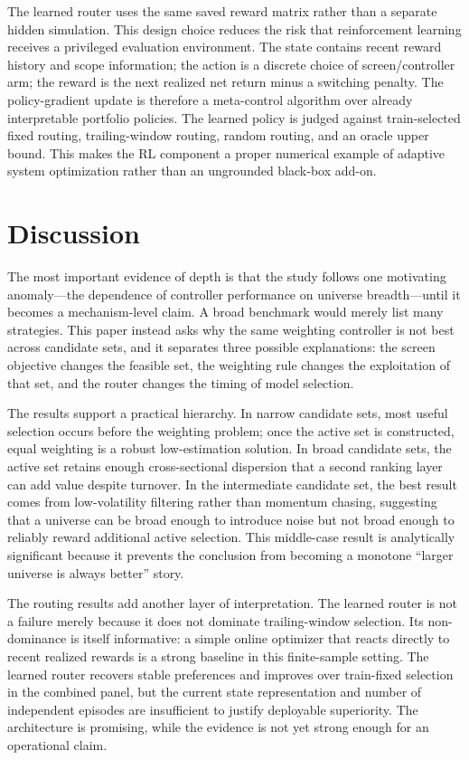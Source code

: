 \documentclass[journal,10pt]{IEEEtran}
\begin{document}
The learned router uses the same saved reward matrix rather than a separate hidden simulation. This design choice reduces the risk that reinforcement learning receives a privileged evaluation environment. The state contains recent reward history and scope information; the action is a discrete choice of screen/controller arm; the reward is the next realized net return minus a switching penalty. The policy-gradient update is therefore a meta-control algorithm over already interpretable portfolio policies. The learned policy is judged against train-selected fixed routing, trailing-window routing, random routing, and an oracle upper bound. This makes the RL component a proper numerical example of adaptive system optimization rather than an ungrounded black-box add-on.

\section{Discussion}
The most important evidence of depth is that the study follows one motivating anomaly---the dependence of controller performance on universe breadth---until it becomes a mechanism-level claim. A broad benchmark would merely list many strategies. This paper instead asks why the same weighting controller is not best across candidate sets, and it separates three possible explanations: the screen objective changes the feasible set, the weighting rule changes the exploitation of that set, and the router changes the timing of model selection.

The results support a practical hierarchy. In narrow candidate sets, most useful selection occurs before the weighting problem; once the active set is constructed, equal weighting is a robust low-estimation solution. In broad candidate sets, the active set retains enough cross-sectional dispersion that a second ranking layer can add value despite turnover. In the intermediate candidate set, the best result comes from low-volatility filtering rather than momentum chasing, suggesting that a universe can be broad enough to introduce noise but not broad enough to reliably reward additional active selection. This middle-case result is analytically significant because it prevents the conclusion from becoming a monotone ``larger universe is always better'' story.

The routing results add another layer of interpretation. The learned router is not a failure merely because it does not dominate trailing-window selection. Its non-dominance is itself informative: a simple online optimizer that reacts directly to recent realized rewards is a strong baseline in this finite-sample setting. The learned router recovers stable preferences and improves over train-fixed selection in the combined panel, but the current state representation and number of independent episodes are insufficient to justify deployable superiority. The architecture is promising, while the evidence is not yet strong enough for an operational claim.
\end{document}
